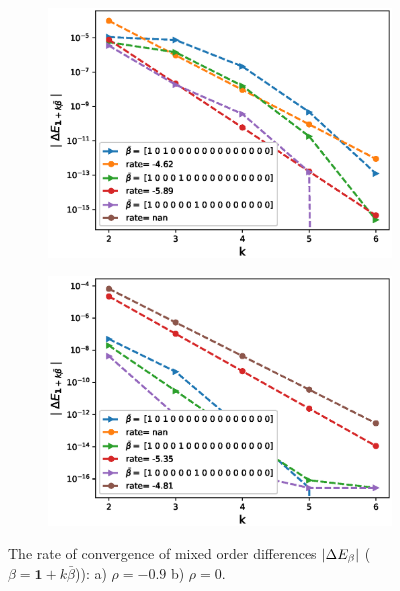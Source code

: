 \documentclass[11pt]{article}
\begin{document}
\begin{figure}[h!]
\centering
\begin{subfigure}{.5\textwidth}
\centering
\includegraphics[width=1\linewidth]{./figures/effect_rho_differences/H_0_43_K_0_8/N_8/mixed_difference_order2_rbergomi_8steps_H_043_K_0_8_rho__0_9_with_rate_W1}
\caption{}
\label{fig:sub3}
\end{subfigure}%
\begin{subfigure}{.5\textwidth}
\centering
\includegraphics[width=1\linewidth]{./figures/effect_rho_differences/H_0_43_K_0_8/N_8/mixed_difference_order2_rbergomi_8steps_H_043_K_0_8_rho_0_with_rate_W1}
\caption{}
\label{fig:sub4}
\end{subfigure}

\caption{The rate of convergence of  mixed order differences $\left\lvert\Delta E_{\beta}\right\rvert$ ($\beta=\mathbf{1}+k \bar{\beta}$)): a) $\rho=-0.9$ b)  $\rho=0.$}
\label{fig:test2}
\end{figure}
\end{document}
